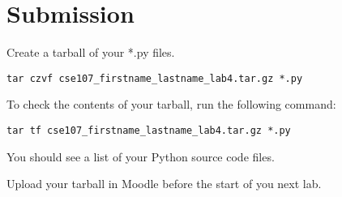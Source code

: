 \documentclass[12pt]{article}
\begin{document}







\section*{Submission}

Create a tarball of your *.py files.

\begin{lstlisting}[style=bash]
tar czvf cse107_firstname_lastname_lab4.tar.gz *.py
\end{lstlisting}


To check the contents of your tarball, run the following command:

\begin{lstlisting}[style=bash]
tar tf cse107_firstname_lastname_lab4.tar.gz *.py
\end{lstlisting}

You should see a list of your Python source code files.

Upload your tarball in Moodle before the start of you next lab.
\end{document}
